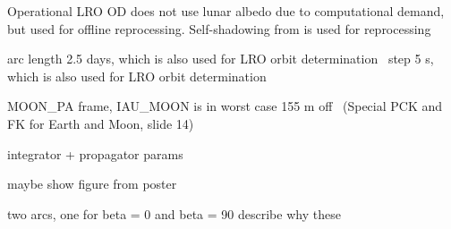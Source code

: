 Operational LRO OD does not use lunar albedo due to computational demand, but used for offline reprocessing.
Self-shadowing from \citeauthor{Mazarico2009} is used for reprocessing~\cite{Nicholson2010}

arc length 2.5 days, which is also used for LRO orbit determination~\cite{Mazarico2011}
step 5 s, which is also used for LRO orbit determination~\cite{Mazarico2018}

MOON\_PA frame, IAU\_MOON is in worst case 155 m off~\cite{NAIF2020} (Special PCK and FK for Earth and Moon, slide 14)

integrator + propagator params


maybe show figure from poster

two arcs, one for beta = 0 and beta = 90
describe why these
